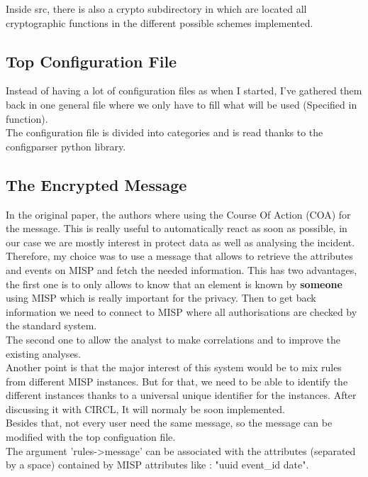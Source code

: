 \documentclass{eplmastersthesis}
\begin{document}
Inside src, there is also a crypto subdirectory in which are located all cryptographic functions in the different possible schemes implemented.

\subsection{Top Configuration File}
Instead of having a lot of configuration files as when I started, I've gathered them back in one general file where we only have to fill what will be used (Specified in function).\\
The configuration file is divided into categories and is read thanks to the configparser python library.

\subsection{The Encrypted Message}
In the original paper, the authors where using the Course Of Action (COA) for the message. This is really useful to automatically react as soon as possible, in our case we are mostly interest in protect data as well as analysing the incident.\\
Therefore, my choice was to use a message that allows to retrieve the attributes and events on MISP and fetch the needed information. This has two advantages, the first one is to only allows to know that an element is known by \textbf{someone} using MISP which is really important for the privacy. Then to get back information we need to connect to MISP where all authorisations are checked by the standard system.\\
The second one to allow the analyst to make correlations and to improve the existing analyses.\\

Another point is that the major interest of this system would be to mix rules from different MISP instances. But for that, we need to be able to identify the different instances thanks to a universal unique identifier for the instances. After discussing it with CIRCL, It will normaly be soon implemented. \\

Besides that, not every user need the same message, so the message can be modified with the top configuation file.\\
The argument 'rules->message' can be associated with the attributes (separated by a space) contained by MISP attributes like : "uuid event\_id date".
\end{document}
